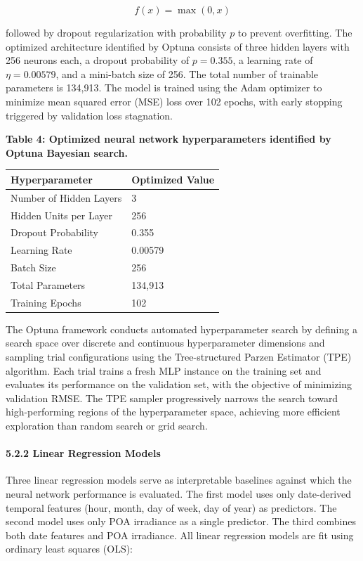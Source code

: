 \documentclass[
  11pt,
]{article}
\newcounter{none} %
\begin{document}
\[f(x) = \max(0, x)\]

followed by dropout regularization with probability \(p\) to prevent
overfitting. The optimized architecture identified by Optuna consists of
three hidden layers with 256 neurons each, a dropout probability of
\(p = 0.355\), a learning rate of \(\eta = 0.00579\), and a mini-batch
size of 256. The total number of trainable parameters is 134,913. The
model is trained using the Adam optimizer to minimize mean squared error
(MSE) loss over 102 epochs, with early stopping triggered by validation
loss stagnation.

\textbf{Table 4: Optimized neural network hyperparameters identified by
Optuna Bayesian search.}

{\def\LTcaptype{none} %
\begin{longtable}[]{@{}ll@{}}
\toprule\noalign{}
Hyperparameter & Optimized Value \\
\midrule\noalign{}
\endhead
\bottomrule\noalign{}
\endlastfoot
Number of Hidden Layers & 3 \\
Hidden Units per Layer & 256 \\
Dropout Probability & 0.355 \\
Learning Rate & 0.00579 \\
Batch Size & 256 \\
Total Parameters & 134,913 \\
Training Epochs & 102 \\
\end{longtable}
}

The Optuna framework conducts automated hyperparameter search by
defining a search space over discrete and continuous hyperparameter
dimensions and sampling trial configurations using the Tree-structured
Parzen Estimator (TPE) algorithm. Each trial trains a fresh MLP instance
on the training set and evaluates its performance on the validation set,
with the objective of minimizing validation RMSE. The TPE sampler
progressively narrows the search toward high-performing regions of the
hyperparameter space, achieving more efficient exploration than random
search or grid search.

\paragraph{5.2.2 Linear Regression
Models}\label{linear-regression-models}

Three linear regression models serve as interpretable baselines against
which the neural network performance is evaluated. The first model uses
only date-derived temporal features (hour, month, day of week, day of
year) as predictors. The second model uses only POA irradiance as a
single predictor. The third combines both date features and POA
irradiance. All linear regression models are fit using ordinary least
squares (OLS):
\end{document}

